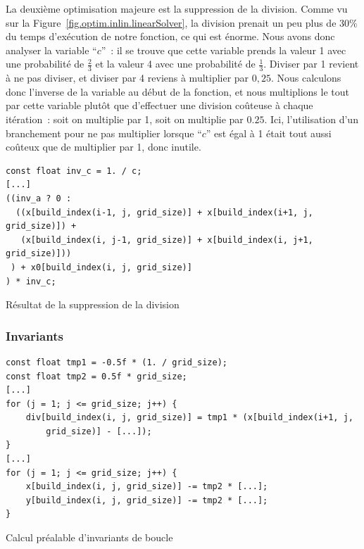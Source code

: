 \documentclass[12pt,a4paper]{article}
\begin{document}
La deuxième optimisation majeure est la suppression de la division. Comme vu sur
la Figure~\ref{fig.optim.inlin.linearSolver}, la division prenait un peu plus de
$30\%$ du temps d'exécution de notre fonction, ce qui est énorme. Nous avons
donc analyser la variable \enquote{$c$} : il se trouve que cette variable prends
la valeur 1 avec une probabilité de $\frac{2}{3}$ et la valeur 4 avec une
probabilité de $\frac{1}{3}$. Diviser par 1 revient à ne pas diviser, et diviser
par 4 reviens à multiplier par $0,25$. Nous calculons donc l'inverse de la
variable au début de la fonction, et nous multiplions le tout par cette variable
plutôt que d'effectuer une division coûteuse à chaque itération : soit on
multiplie par 1, soit on multiplie par $0.25$. Ici, l'utilisation d'un
branchement pour ne pas multiplier lorsque \enquote{$c$} est égal à 1 était tout
aussi coûteux que de multiplier par 1, donc inutile.

\begin{listing}
    \begin{verbatim}
const float inv_c = 1. / c;
[...]
((inv_a ? 0 :
  ((x[build_index(i-1, j, grid_size)] + x[build_index(i+1, j, grid_size)]) +
   (x[build_index(i, j-1, grid_size)] + x[build_index(i, j+1, grid_size)]))
 ) + x0[build_index(i, j, grid_size)]
) * inv_c;
    \end{verbatim}
    \caption{Résultat de la suppression de la division}
    \label{lst.optim.calc.div}
\end{listing}

\subsubsection{Invariants}
\label{sub.optim.calc.inv}

\begin{listing}
    \begin{verbatim}
const float tmp1 = -0.5f * (1. / grid_size);
const float tmp2 = 0.5f * grid_size;
[...]
for (j = 1; j <= grid_size; j++) {
    div[build_index(i, j, grid_size)] = tmp1 * (x[build_index(i+1, j,
        grid_size)] - [...]);
}
[...]
for (j = 1; j <= grid_size; j++) {
    x[build_index(i, j, grid_size)] -= tmp2 * [...];
    y[build_index(i, j, grid_size)] -= tmp2 * [...];
}
    \end{verbatim}
    \caption{Calcul préalable d'invariants de boucle}
    \label{lst.optim.calc.inv}
\end{listing}
\end{document}
